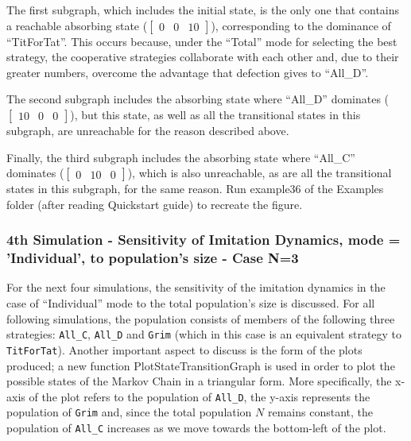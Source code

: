 The first subgraph, which includes the initial state, is the only one that contains a reachable absorbing state ($\begin{bmatrix}0 & 0 & 10\end{bmatrix}$), corresponding to the dominance of ``TitForTat''. This occurs because, under the ``Total'' mode for selecting the best strategy, the cooperative strategies collaborate with each other and, due to their greater numbers, overcome the advantage that defection gives to ``All\_D''.

The second subgraph includes the absorbing state where ``All\_D'' dominates ($\begin{bmatrix}10 & 0 & 0\end{bmatrix}$), but this state, as well as all the transitional states in this subgraph, are unreachable for the reason described above.

Finally, the third subgraph includes the absorbing state where ``All\_C'' dominates ($\begin{bmatrix}0 & 10 & 0\end{bmatrix}$), which is also unreachable, as are all the transitional states in this subgraph, for the same reason. Run example36 of the Examples folder (after reading Quickstart guide) to recreate the figure.

\subsubsection{4th Simulation - Sensitivity of Imitation Dynamics, mode = 'Individual', to population's size - Case N=3}
For the next four simulations, the sensitivity of the imitation dynamics in the case of ``Individual'' mode to the total population's size is discussed. For all following simulations, the population consists of members of the following three strategies: \texttt{All\_C}, \texttt{All\_D} and \texttt{Grim} (which in this case is an equivalent strategy to \texttt{TitForTat}). Another important aspect to discuss is the form of the plots produced; a new function PlotStateTransitionGraph is used in order to plot the possible states of the Markov Chain in a triangular form. More specifically, the x-axis of the plot refers to the population of \texttt{All\_D}, the y-axis represents the population of \texttt{Grim} and, since the total population $N$ remains constant, the population of \texttt{All\_C} increases as we move towards the bottom-left of the plot. 

